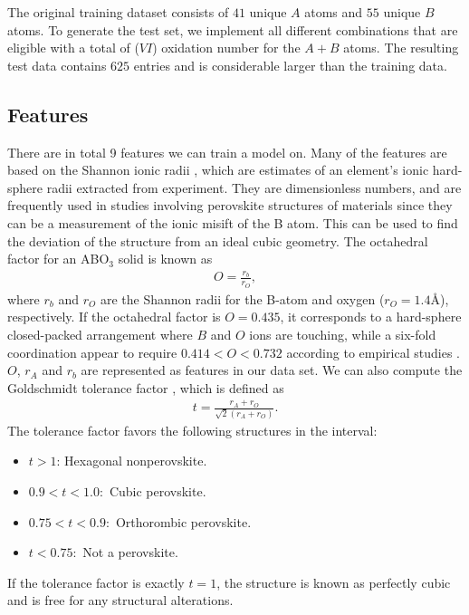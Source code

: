 The original training dataset consists of $41$ unique $A$ atoms and $55$ unique $B$ atoms. To generate the test set, we implement all different combinations that are eligible with a total of ($VI$) oxidation number for the $A+B$ atoms. The resulting test data contains $625$ entries and is considerable larger than the training data.

\subsection{Features}

There are in total 9 features we can train a model on. Many of the features are based on the Shannon ionic radii \cite{Shannon1976}, which are estimates of an element's ionic hard-sphere radii extracted from experiment. They are dimensionless numbers, and are frequently used in studies involving perovskite structures of materials since they can be a measurement of the ionic misift of the B atom. This can be used to find the deviation of the structure from an ideal cubic geometry. The octahedral factor for an ABO$_3$ solid is known as
\begin{align}
  O = \frac{r_b}{r_O},
\end{align}
where $r_b$ and $r_O$ are the Shannon radii for the B-atom and oxygen ($r_O = 1.4\text{\AA}$), respectively. If the octahedral factor is $O=0.435$, it corresponds to a hard-sphere closed-packed arrangement where $B$ and $O$ ions are touching, while a six-fold coordination appear to require $0.414 < O < 0.732$ according to empirical studies \cite{Zhang2007}. $O$, $r_A$ and $r_b$ are represented as features in our data set. We can also compute the Goldschmidt tolerance factor \cite{Goldschmidt1926}, which is defined as
\begin{align}
  t = \frac{r_A + r_O}{\sqrt{2}(r_A+r_O)}.
\end{align}
\noindent The tolerance factor favors the following structures in the interval:
\begin{itemize}
  \item $t>1$: Hexagonal nonperovskite.
  \item $0.9 < t < 1.0:$ Cubic perovskite.
  \item $0.75 < t < 0.9:$ Orthorombic perovskite.
  \item $t < 0.75:$ Not a perovskite.
\end{itemize}
\noindent If the tolerance factor is exactly $t=1$, the structure is known as perfectly cubic and is free for any structural alterations.

